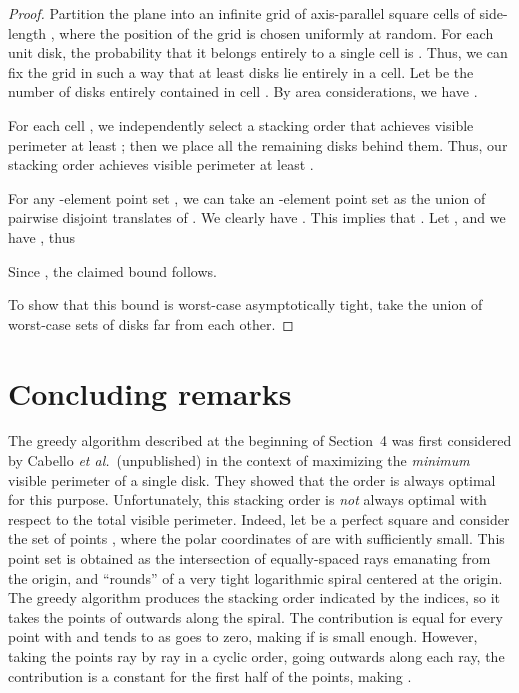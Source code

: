 \documentclass[11pt]{article}
\begin{document}
\begin{proof}
Partition the plane into an infinite grid of axis-parallel square cells of side-length , where the position of the grid is chosen uniformly at random. For each unit disk, the probability that it belongs entirely to a single cell is . Thus, we
can fix the grid in such a way that at least  disks lie entirely in a cell. Let  be the number of disks entirely contained in cell . By area considerations, we have .

For each cell , we independently select a stacking order that achieves visible perimeter at least ; then we place all the remaining disks behind them. Thus, our stacking order achieves visible perimeter at least .

For any -element point set , we can take an -element point set
 as the union of  pairwise disjoint translates of . We
clearly have . This implies that
. Let , and we have
, thus


Since , the claimed bound follows.

To show that this bound is worst-case asymptotically tight, take the union of  worst-case sets of  disks far from each other.
\end{proof}

\section{Concluding remarks}

 The greedy algorithm described at the beginning of
Section~4 was first considered by Cabello {\em et al.}\ (unpublished) in the context
of maximizing the \emph{minimum} visible perimeter of a single disk.
They showed that the order  is always optimal
for this purpose. Unfortunately, this stacking order is \emph{not}
always optimal with respect to the total visible perimeter. Indeed, let  be
a perfect square and consider the set of points , where
the polar coordinates of  are  with 
sufficiently small. This point set is obtained as the intersection of
 equally-spaced rays
emanating from the origin, and  ``rounds'' of a very tight
logarithmic spiral centered at the origin. The greedy algorithm produces the
stacking order indicated by the indices, so it takes the
points of  outwards along the spiral. The contribution  is equal for
every point  with  and tends to  as 
goes to zero, making
 if  is small enough. However, taking the points ray by ray in a cyclic
order, going outwards along each ray, the contribution  is a constant
for the first half of the points, making .
\end{document}
